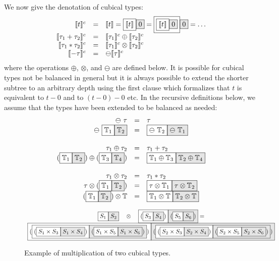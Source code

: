 \documentclass[authoryear,preprint]{sigplanconf}
\newcommand{\cubt}{\mathbb{T}}
\newcommand{\den}[1]{\llbracket #1 \rrbracket}
\newcommand{\denc}[1]{\llbracket #1 \rrbracket^c}
\newcommand{\nodet}[2]{\fcolorbox{black}{white}{$#1$}\fcolorbox{black}{gray!20}{$#2$}}
\begin{document}
We now give the denotation of cubical types:
\[\begin{array}{rcl}
\denc{t} &=& \den{t} = \nodet{\den{t}}{0} = 
  \nodet{\nodet{\den{t}}{0}}{0} = \ldots \\
\denc{\tau_1 + \tau_2} &=& \denc{\tau_1} \oplus \denc{\tau_2} \\
\denc{\tau_1 * \tau_2} &=& \denc{\tau_1} \otimes \denc{\tau_2} \\
\denc{- \tau} &=& \ominus \denc{\tau}
\end{array}\]
where the operations $\oplus$, $\otimes$, and $\ominus$ are defined below.
It is possible for cubical types not be balanced in general but it is always
possible to extend the shorter subtree to an arbitrary depth using the first
clause which formalizes that $t$ is equivalent to $t-0$ and to $(t-0)-0$ etc.
In the recursive definitions below, we assume that the types have been
extended to be balanced as needed:
\[\begin{array}{rcl}
\ominus~\tau &=& \tau \\
\ominus~\nodet{\cubt_1}{\cubt_2} &=& \nodet{\ominus~\cubt_2}{\ominus~\cubt_1} \\
\\
\tau_1 \oplus \tau_2 &=& \tau_1 + \tau_2 \\
(\nodet{\cubt_1}{\cubt_2}) \oplus (\nodet{\cubt_3}{\cubt_4}) &=& 
  \nodet{\cubt_1 \oplus \cubt_3}{\cubt_2 \oplus \cubt_4} \\
\\
\tau_1 \otimes \tau_2 &=& \tau_1 * \tau_2 \\
\tau \otimes (\nodet{\cubt_1}{\cubt_2}) &=& 
  \nodet{\tau \otimes \cubt_1}{\tau \otimes \cubt_2} \\
(\nodet{\cubt_1}{\cubt_2}) \otimes \cubt &=& 
  \nodet{\cubt_1 \otimes \cubt}{\cubt_2 \otimes \cubt}
\end{array}\]

\begin{figure*}
\[\begin{array}{c}
\nodet{S_1}{S_2}
\quad\otimes\quad
\nodet{(\nodet{S_3}{S_4})}{(\nodet{S_5}{S_6})} = 
\\
\nodet{(\nodet{{(\nodet{S_1 \times S_3}{S_1 \times S_4})}}
              {{(\nodet{S_1 \times S_5}{S_1 \times S_6})}})}
      {(\nodet{{(\nodet{S_2 \times S_3}{S_2 \times S_4})}}
              {{(\nodet{S_2 \times S_5}{S_2 \times S_6})}})}
\end{array}\]
\caption{\label{mult}Example of multiplication of two cubical types.}
\end{figure*}
\end{document}
